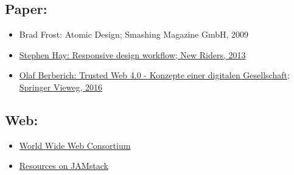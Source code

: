 \subsection*{Paper:\label{/mi-2017/modulbeschreibungen-master/MA_WTW_Modul_Web-Technologien}}\label{paperpathlabelmi-2017modulbeschreibungen-mastermaux5fwtwux5fmodulux5fweb-technologien}

\begin{itemize}
\tightlist
\item
  Brad Frost: Atomic Design; Smashing Magazine GmbH, 2009
\item
  \href{http://www.digibib.net/permalink/832/FHBK-x/HBZ:HT017780178}{Stephen
  Hay: Responsive design workflow; New Riders, 2013}
\item
  \href{http://www.digibib.net/permalink/832/FHBK-x/HBZ:HT019048164}{Olaf
  Berberich: Trusted Web 4.0 - Konzepte einer digitalen Gesellschaft;
  Springer Vieweg, 2016}
\end{itemize}

\subsection*{Web:\label{/mi-2017/modulbeschreibungen-master/MA_WTW_Modul_Web-Technologien}}\label{webpathlabelmi-2017modulbeschreibungen-mastermaux5fwtwux5fmodulux5fweb-technologien}

\begin{itemize}
\tightlist
\item
  \href{https://www.w3.org/}{World Wide Web Consortium}
\item
  \href{https://jamstack.org/resources/}{Resources on JAMstack}
\end{itemize}

